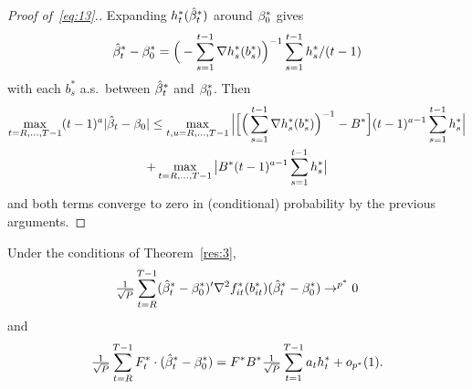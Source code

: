\documentclass[12pt,fleqn]{article}
\begin{document}
\begin{proof}[Proof of~\eqref{eq:13}.]
Expanding $h_t^*(\hat \beta_t^*)$ around $\beta_0^*$ gives
\begin{equation*}
\hat \beta_t^* - \beta_0^* = \Big(- \sum_{s=1}^{t-1} \nabla h_s^*(b_s^*) \Big)^{-1} \sum_{s=1}^{t-1} h_s^* / (t-1)
\end{equation*}
with each $b_s^*$ a.s.\ between $\hat \beta_t^*$ and $\beta_0^*$. Then
\begin{multline}
  \max_{t=R,\dots,T-1} (t-1)^a | \hat{\beta}_t - \beta_0 |
  \leq
  \max_{t,u=R,\dots,T-1} \Big|\Big[ \Big(\sum_{s=1}^{t-1} \nabla h_s^*(b_s^*) \Big)^{-1} - B^* \Big]
  (t-1)^{a-1} \sum_{s=1}^{t-1} h_s^* \Big|\\
  + \max_{t=R,\dots,T-1} \big| B^*   (t-1)^{a-1} \sum_{s=1}^{t-1} h_s^* \big|
\end{multline}
and both terms converge to zero in (conditional) probability by the
previous arguments.
\end{proof}

\begin{lema}\label{res:a4}
  Under the conditions of Theorem~\ref{res:3},
  \begin{equation}\label{eq:16}
    \tfrac{1}{\sqrt{P}} \sum_{t=R}^{T-1} (\hat \beta_t^* - \beta_0^*)' \nabla^2 f_{it}^*(b_{it}^*) (\hat \beta_t^* - \beta_0^*) \to^{p^*} 0
  \end{equation}
  and
  \begin{equation}\label{eq:17}
    \tfrac{1}{\sqrt{P}} \sum_{t=R}^{T-1} F_t^* \cdot (\hat \beta_t^* - \beta_0^*)
    = F^* B^* \tfrac{1}{\sqrt{P}} \sum_{t=1}^{T-1} a_t h_t^* + o_{p^*}(1).
  \end{equation}
\end{lema}
\end{document}
